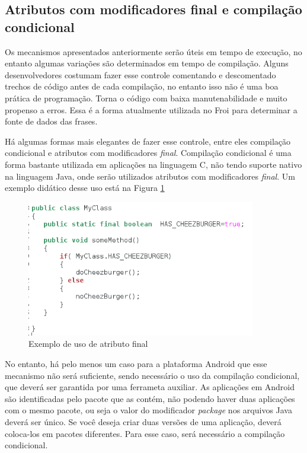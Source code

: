 \subsection{Atributos com modificadores final e compilação condicional}

Os mecanismos apresentados anteriormente serão úteis em tempo de execução, no entanto
algumas variações são determinados em tempo de compilação. Alguns desenvolvedores 
costumam fazer esse controle comentando e descomentado trechos de código antes de 
cada compilação, no entanto isso não é uma boa prática de programação. Torna o código
com baixa manutenabilidade e muito propenso a erros. Essa é a forma atualmente utilizada 
no Froi para determinar a fonte de dados das frases.

Há algumas formas mais elegantes de fazer esse controle, entre eles compilação condicional 
e atributos com modificadores {\it final}. Compilação condicional é uma forma 
bastante utilizada em aplicações na linguagem C, não tendo suporte nativo na linguagem 
Java, onde serão utilizados atributos com modificadores {\it final}. Um exemplo didático 
desse uso está na Figura \ref{atributo_final}

\begin{figure}[h]
    \centering
    \includegraphics[width=10cm]{img/MyClass}
    \caption{Exemplo de uso de atributo final}
    \label{atributo_final}
\end{figure}

No entanto, há pelo menos um caso para a plataforma Android que esse mecanismo não será suficiente, sendo necessário o uso da compilação condicional, que deverá ser garantida por uma 
ferrameta auxiliar. As aplicações em Android são identificadas pelo pacote que as contém,
não podendo haver duas aplicações com o mesmo pacote, ou seja o valor do modificador 
{\it package} nos arquivos Java deverá ser único. Se você deseja criar duas versões de uma aplicação, 
deverá coloca-los em pacotes diferentes. Para esse caso, será necessário a compilação 
condicional.

